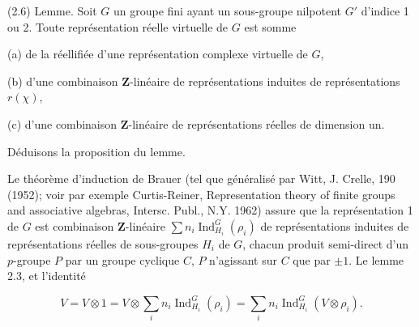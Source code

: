 \documentclass[9pt,twoside]{extarticle}
\begin{document}
{(2.6) Lemme. Soit \(G\) un groupe fini ayant un sous-groupe nilpotent \(G'\) d’indice 1 ou 2. Toute représentation réelle virtuelle de \(G\) est somme\par

(a) de la réellifiée d’une représentation complexe virtuelle de \(G\),\par

(b) d’une combinaison \(\mathbf Z\)-linéaire de représentations induites de représentations \(r(\chi)\),\par

(c) d’une combinaison \(\mathbf Z\)-linéaire de représentations réelles de dimension un.\par

Déduisons la proposition du lemme.\par

Le théorème d’induction de Brauer (tel que généralisé par Witt, J. Crelle, 190 (1952); voir par exemple Curtis-Reiner, Representation theory of finite groups and associative algebras, Intersc. Publ., N.Y. 1962) assure que la représentation 1 de \(G\) est combinaison \(\mathbf Z\)-linéaire \(\sum n_i\operatorname{Ind}_{H_i}^G(\rho_i)\) de représentations induites de représentations réelles de sous-groupes \(H_i\) de \(G\), chacun produit semi-direct d’un \(p\)-groupe \(P\) par un groupe cyclique \(C\), \(P\) n’agissant sur \(C\) que par \(\pm1\). Le lemme 2.3, et l’identité\par

\[
V=V\otimes1=V\otimes\sum_i n_i\operatorname{Ind}_{H_i}^G(\rho_i)=\sum_i n_i\operatorname{Ind}_{H_i}^G(V\otimes\rho_i).
\]
}
\end{document}
